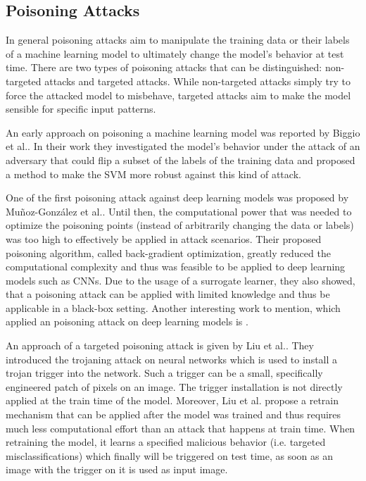 \documentclass[sigconf]{acmart}
\begin{document}
\subsection{Poisoning Attacks}
\label{sec:poison}

In general poisoning attacks aim to manipulate the training data or their labels of a machine learning model to ultimately change the model's behavior at test time.
There are two types of poisoning attacks that can be distinguished: non-targeted attacks and targeted attacks.
While non-targeted attacks simply try to force the attacked model to misbehave, targeted attacks aim to make the model sensible for specific input patterns.

An early approach on poisoning a machine learning model was reported by Biggio et al.\cite{svmPoison}.
In their work they investigated the model's behavior under the attack of an adversary that could flip a subset of the labels of the training data and proposed a method to make the SVM more robust against this kind of attack.

One of the first poisoning attack against deep learning models was proposed by Muñoz-González et al.\cite{DBLP:journals/corr/abs-1708-08689}.
Until then, the computational power that was needed to optimize the poisoning points (instead of arbitrarily changing the data or labels) was too high to effectively be applied in attack scenarios.
Their proposed poisoning algorithm, called back-gradient optimization, greatly reduced the computational complexity and thus was feasible to be applied to deep learning models such as CNNs. 
Due to the usage of a surrogate learner, they also showed, that a poisoning attack can be applied with limited knowledge and thus be applicable in a black-box setting.
Another interesting work to mention, which applied an poisoning attack on deep learning models is \cite{koh2017understanding}.

An approach of a targeted poisoning attack is given by Liu et al.\cite{trojanattack}.
They introduced the trojaning attack on neural networks which is used to install a trojan trigger into the network.
Such a trigger can be a small, specifically engineered patch of pixels on an image.
The trigger installation is not directly applied at the train time of the model.
Moreover, Liu et al. propose a retrain mechanism that can be applied after the model was trained and thus requires much less computational effort than an attack that happens at train time.
When retraining the model, it learns a specified malicious behavior (i.e. targeted misclassifications) which finally will be triggered on test time, as soon as an image with the trigger on it is used as input image.
\end{document}
